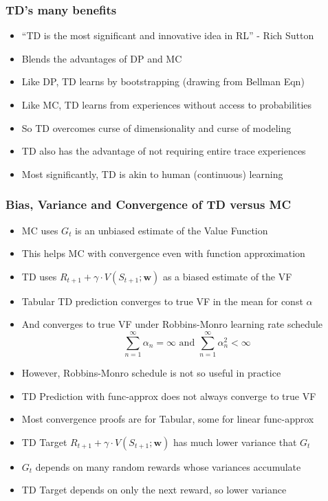 \documentclass[handout]{beamer}
\begin{document}
\begin{frame}
\frametitle{TD's many benefits}
\pause
\begin{itemize}[<+->]
\item ``TD is the most significant and innovative idea in RL'' - Rich Sutton
\item Blends the advantages of DP and MC
\item Like DP, TD learns by bootstrapping (drawing from Bellman Eqn)
\item Like MC, TD learns from experiences without access to probabilities
\item So TD overcomes curse of dimensionality and curse of modeling
\item TD also has the advantage of not requiring entire trace experiences
\item Most significantly, TD is akin to human (continuous) learning
\end{itemize}
\end{frame}


\begin{frame}
\frametitle{Bias, Variance and Convergence of TD versus MC}
\pause
\begin{itemize}[<+->]
\item MC uses $G_t$ is an unbiased estimate of the Value Function
\item This helps MC with convergence even with function approximation
\item TD uses $R_{t+1} + \gamma \cdot V(S_{t+1};\bm{w})$ as a biased estimate of the VF
\item Tabular TD prediction converges to true VF in the mean for const $\alpha$
\item And converges to true VF under Robbins-Monro learning rate schedule
$$\sum_{n=1}^{\infty} \alpha_n = \infty \text{ and } \sum_{n=1}^{\infty} \alpha_n^2 < \infty$$
\item However, Robbins-Monro schedule is not so useful in practice
\item TD Prediction with func-approx does not always converge to true VF
\item Most convergence proofs are for Tabular, some for linear func-approx
\item TD Target $R_{t+1} + \gamma \cdot V(S_{t+1}; \bm{w})$ has much lower variance that $G_t$
\item $G_t$ depends on many random rewards whose variances accumulate
\item TD Target depends on only the next reward, so lower variance
\end{itemize}
\end{frame}
\end{document}
